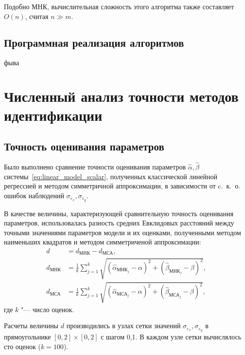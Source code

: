 Подобно МНК, вычислительная сложность этого алгоритма также составляет \( O(n) \),
считая \( n \gg m \).

\vspace{2\baselineskip}
\subsection{Программная реализация алгоритмов}

фыва

\section{Численный анализ точности методов идентификации}

\subsection{Точность оценивания параметров}

Было выполнено сравнение точности оценивания параметров
\( \hat{\alpha}, \hat{\beta} \) системы~\eqref{eq:linear_model_scalar},
полученных классической линейной регрессией и методом симметричной аппроксимации,
в зависимости от c.~к.~о. ошибок наблюдений \( \sigma_{\varepsilon_x}, \sigma_{\varepsilon_y} \).

В качестве величины, характеризующей сравнительную точность оценивания параметров,
использовалась разность средних Евклидовых расстояний
между точными значениями параметров модели и их оценками,
полученными методом наименьших квадратов и методом симметриченой аппроксимации:
\begin{equation*}
  \begin{aligned}
    d &= d_{\text{МНК}} - d_{\text{МСА}}, \\
    d_{\text{МНК}} &= \frac{1}{k} \sum_{j=1}^k \sqrt{(\hat{\alpha}_{\text{МНК}_j} - \alpha)^2 + (\hat{\beta}_{\text{МНК}_j} - \beta)^2}, \\
    d_{\text{МСА}} &= \frac{1}{k} \sum_{j=1}^k \sqrt{(\hat{\alpha}_{\text{МСА}_j} - \alpha)^2 + (\hat{\beta}_{\text{МСА}_j} - \beta)^2},
  \end{aligned}
\end{equation*}
где \( k \) "--- число оценок.

Расчеты величины \( d \) производились в узлах сетки значений
\( \sigma_{\varepsilon_x}, \sigma_{\varepsilon_y} \) в прямоугольнике
\( [0, 2] \times [0, 2] \) с шагом 0{,}1.
В каждом узле сетки вычислялось сто оценок (\( k = 100 \)).

